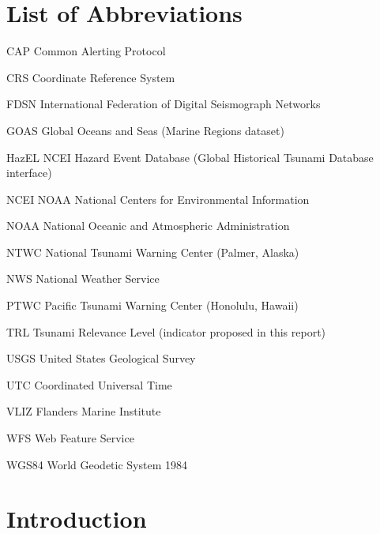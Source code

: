 \documentclass[a4paper,11pt,oneside]{book}
\begin{document}
    \tableofcontents
    \listoffigures
    \listoftables

    \chapter*{List of Abbreviations}
    \begin{abbrv}
        \item[CAP]      Common Alerting Protocol
        \item[CRS]      Coordinate Reference System
        \item[FDSN]     International Federation of Digital Seismograph Networks
        \item[GOAS]     Global Oceans and Seas (Marine Regions dataset)
        \item[HazEL]    NCEI Hazard Event Database (Global Historical Tsunami Database interface)
        \item[NCEI]     NOAA National Centers for Environmental Information
        \item[NOAA]     National Oceanic and Atmospheric Administration
        \item[NTWC]     National Tsunami Warning Center (Palmer, Alaska)
        \item[NWS]      National Weather Service
        \item[PTWC]     Pacific Tsunami Warning Center (Honolulu, Hawaii)
        \item[TRL]      Tsunami Relevance Level (indicator proposed in this report)
        \item[USGS]     United States Geological Survey
        \item[UTC]      Coordinated Universal Time
        \item[VLIZ]     Flanders Marine Institute
        \item[WFS]      Web Feature Service
        \item[WGS84]    World Geodetic System 1984
    \end{abbrv}

    \mainmatter

\chapter{Introduction}
\label{ch:introduction}
\end{document}
